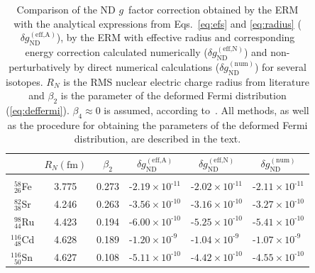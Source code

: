 \begin{table}[b]
\caption{\label{tab:spline}%
Comparison of the ND $g$~factor correction obtained by the ERM with the analytical expressions from Eqs.~\eqref{eq:efs} and \eqref{eq:radius} ($\delta g_{\text{ND}}^{(\text{eff,A})}$), by the ERM with effective radius and corresponding energy correction calculated numerically ($\delta g_{\text{ND}}^{(\text{eff,N})}$) and non-perturbatively by direct numerical calculations ($\delta g_{\text{ND}}^{(\text{num})}$) for several isotopes. $R_N$ is the RMS nuclear electric charge radius from literature \cite{Angeli2013} and $\beta_2$ is the parameter of the deformed Fermi distribution (\ref{eq:deffermi}). $\beta_4 \approx 0$ is assumed, according to~\cite{Moller1995}. All methods, as well as the procedure for obtaining the parameters of the deformed Fermi distribution, are described in the text.
}
\centering
\begin{tabular}{lccccc}
 &$R{\scriptstyle _N(\text{fm})}$& $\beta_2$ & $\delta g_{\text{ND}}^{(\text{eff,A})}$ & $\delta g_{\text{ND}}^{(\text{eff,N})}$ & $\delta g_{\text{ND}}^{(\text{num})}$\\
\hline\\[-5pt]
$^{\phantom{0}58}_{\phantom{0}26}$Fe & 3.775 & 0.273 & ${\text{-}}{2.19}{\scriptstyle\times}{10^{\text{-}11}}$ &${\text{-}}{2.02}{\scriptstyle\times}{10^{\text{-}11}}$&${\text{-}}{2.11}{\scriptstyle\times}{10^{\text{-}11}}$\\[4pt]
$^{\phantom{0}82}_{\phantom{0}38}$Sr & 4.246 & 0.263 & ${\text{-}}{3.56}{\scriptstyle\times}{10^{\text{-}10}}$ &${\text{-}}{3.16}{\scriptstyle\times}{10^{\text{-}10}}$&${\text{-}}{3.27}{\scriptstyle\times}{10^{\text{-}10}}$\\[4pt]
$^{\phantom{0}98}_{\phantom{0}44}$Ru & 4.423 & 0.194 & ${\text{-}}{6.00}{\scriptstyle\times}{10^{\text{-}10}}$ &${\text{-}}{5.25}{\scriptstyle\times}{10^{\text{-}10}}$&${\text{-}}{5.41}{\scriptstyle\times}{10^{\text{-}10}}$\\[4pt]
$^{116}_{\phantom{0}48}$Cd           & 4.628 & 0.189 & ${\text{-}}{1.20}{\scriptstyle\times}{10^{\text{-}9\phantom{0}}}$ &${\text{-}}{1.04}{\scriptstyle\times}{10^{\text{-}9\phantom{0}}}$&${\text{-}}{1.07}{\scriptstyle\times}{10^{\text{-}9\phantom{0}}}$\\[4pt]
$^{116}_{\phantom{0}50}$Sn           & 4.627 & 0.108 & ${\text{-}}{5.11}{\scriptstyle\times}{10^{\text{-}10}}$ &${\text{-}}{4.42}{\scriptstyle\times}{10^{\text{-}10}}$&${\text{-}}{4.55}{\scriptstyle\times}{10^{\text{-}10}}$\\[4pt]

\end{tabular}
\end{table}
